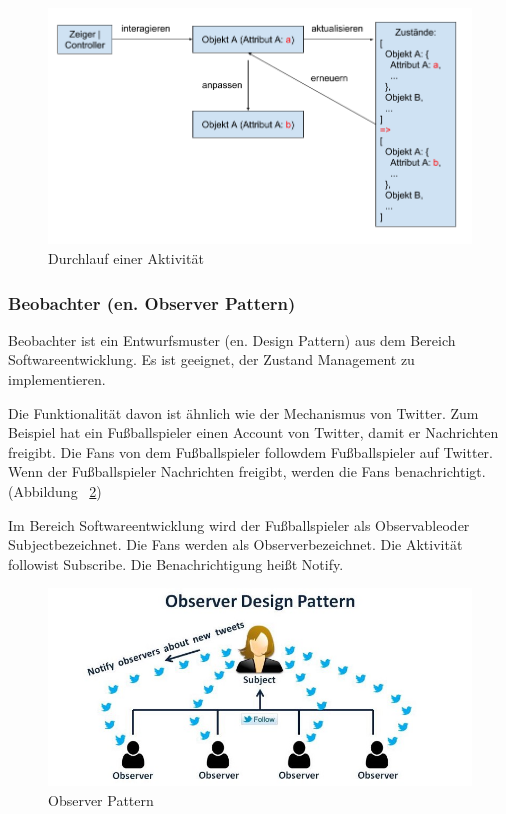 \begin{figure}[ht]
\centering
\includegraphics[width=\textwidth]{images/interaktionVerlauf.png}
\caption[Durchlauf einer Aktivität]{Durchlauf einer Aktivität}
\label{fig:interaktionVerlauf} 
\end{figure}
 
  \subsubsection{Beobachter (en. Observer Pattern)}
  Beobachter ist ein Entwurfsmuster (en. Design Pattern) aus dem Bereich Softwareentwicklung. Es ist geeignet, der Zustand Management zu implementieren.
  
  Die Funktionalität davon ist ähnlich wie der Mechanismus von Twitter. Zum Beispiel hat ein Fußballspieler einen Account von Twitter, damit er Nachrichten freigibt. Die Fans von dem Fußballspieler \glqq follow\grqq dem Fußballspieler auf Twitter. Wenn der Fußballspieler Nachrichten freigibt, werden die Fans benachrichtigt. (Abbildung ~\ref{fig:observerPatern})
  
  Im Bereich Softwareentwicklung wird der Fußballspieler als \glqq Observable\grqq oder \glqq Subject\grqq bezeichnet. Die Fans werden als \glqq Observer\grqq bezeichnet. Die Aktivität \glqq follow\grqq ist \glqq Subscribe\grqq. Die Benachrichtigung heißt \glqq Notify\grqq.
  
\begin{figure}[ht]
\centering
\includegraphics[width=\textwidth]{images/observerPattern.jpeg}
\caption[Observer Pattern]{Observer Pattern}
\label{fig:observerPatern} 
\end{figure}
  

